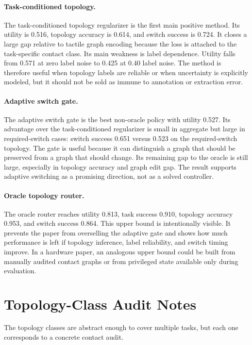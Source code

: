 \documentclass{article}
\begin{document}
\paragraph{Task-conditioned topology.}
The task-conditioned topology regularizer is the first main positive method. Its utility is 0.516, topology accuracy is 0.614, and switch success is 0.724. It closes a large gap relative to tactile graph encoding because the loss is attached to the task-specific contact class. Its main weakness is label dependence. Utility falls from 0.571 at zero label noise to 0.425 at 0.40 label noise. The method is therefore useful when topology labels are reliable or when uncertainty is explicitly modeled, but it should not be sold as immune to annotation or extraction error.

\paragraph{Adaptive switch gate.}
The adaptive switch gate is the best non-oracle policy with utility 0.527. Its advantage over the task-conditioned regularizer is small in aggregate but large in required-switch cases: switch success 0.651 versus 0.523 on the required-switch topology. The gate is useful because it can distinguish a graph that should be preserved from a graph that should change. Its remaining gap to the oracle is still large, especially in topology accuracy and graph edit gap. The result supports adaptive switching as a promising direction, not as a solved controller.

\paragraph{Oracle topology router.}
The oracle router reaches utility 0.813, task success 0.910, topology accuracy 0.953, and switch success 0.864. This upper bound is intentionally visible. It prevents the paper from overselling the adaptive gate and shows how much performance is left if topology inference, label reliability, and switch timing improve. In a hardware paper, an analogous upper bound could be built from manually audited contact graphs or from privileged state available only during evaluation.

\section{Topology-Class Audit Notes}

The topology classes are abstract enough to cover multiple tasks, but each one corresponds to a concrete contact audit.
\end{document}
